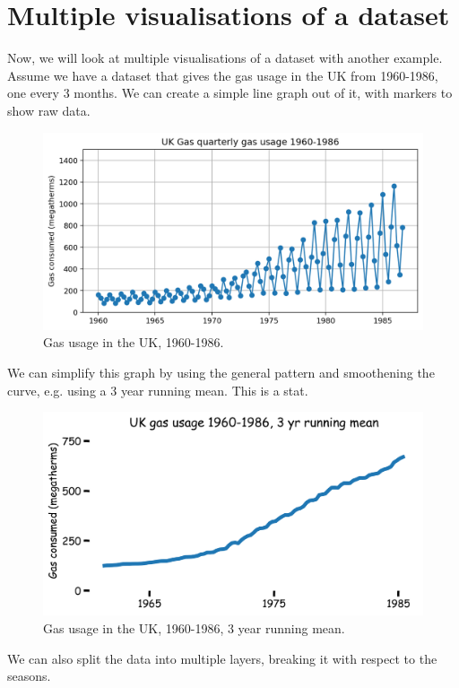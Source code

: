 \documentclass[a4paper, openany]{memoir}
\begin{document}
\section{Multiple visualisations of a dataset}
Now, we will look at multiple visualisations of a dataset with another example. Assume we have a dataset that gives the gas usage in the UK from 1960-1986, one every 3 months. We can create a simple line graph out of it, with markers to show raw data.
\begin{figure}[H]
    \centering
    \includegraphics[scale=0.4]{src/2.16 Gas Example Plot 1.png}
    \caption{Gas usage in the UK, 1960-1986.}
\end{figure}
\noindent We can simplify this graph by using the general pattern and smoothening the curve, e.g. using a 3 year running mean. This is a stat.
\begin{figure}[H]
    \centering
    \includegraphics[scale=0.4]{src/2.17 Gas Example Plot 2.png}
    \caption{Gas usage in the UK, 1960-1986, 3 year running mean.}
\end{figure}
\noindent We can also split the data into multiple layers, breaking it with respect to the seasons.
\end{document}
